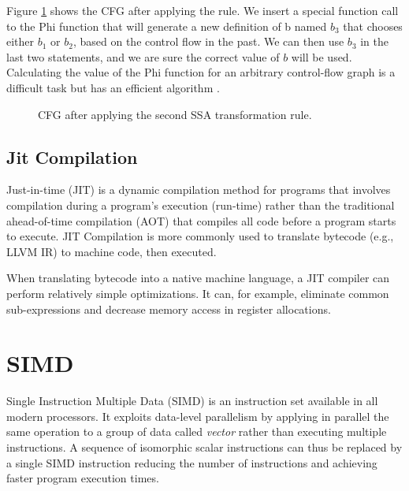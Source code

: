 Figure \ref{fig:cfg3} shows the CFG after applying the rule. We insert a special function call to the Phi function that will generate a new definition of b named $b_3$ that chooses either $b_1$ or $b_2$, based on the control flow in the past. We can then use $b_3$ in the last two statements, and we are sure the correct value of $b$ will be used.
Calculating the value of the Phi function for an arbitrary control-flow graph is a difficult task but has an efficient algorithm \cite{domalgo}.

\begin{figure}[htbp]
\centering
\usetikzlibrary{shapes,calc}
\caption{CFG after applying the second SSA transformation rule.}
\label{fig:cfg3}
\end{figure}


\subsection{Jit Compilation}
Just-in-time (JIT) is a dynamic compilation method for programs that involves compilation during a program's execution (run-time) rather than the traditional ahead-of-time compilation (AOT) that compiles all code before a program starts to execute. JIT Compilation is more commonly used to translate bytecode (e.g., LLVM IR) to machine code, then executed.

When translating bytecode into a native machine language, a JIT compiler can perform relatively simple optimizations. It can, for example, eliminate common sub-expressions and decrease memory access in register allocations.

\section{SIMD}
Single Instruction Multiple Data (SIMD) is an instruction set available in all modern processors. It exploits data-level parallelism by applying in parallel the same operation to a group of data called \textit{vector} rather than executing multiple instructions. A sequence of isomorphic scalar instructions can thus be replaced by a single SIMD instruction reducing the number of instructions and achieving faster program execution times.

